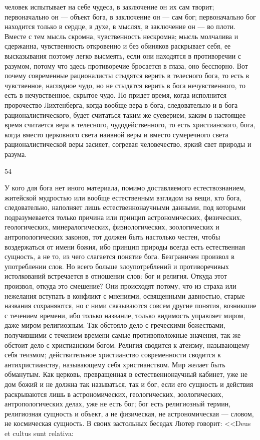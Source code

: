 \documentclass[12pt]{article}
\begin{document}
человек испытывает на себе чудеса, в заключение он их сам творит; первоначально он --- объект бога, в заключение он --- сам бог; первоначально бог находится только в сердце, в духе, в мыслях, в заключение он --- во плоти. Вместе с тем мысль скромна, чувственность нескромна; мысль молчалива и сдержанна, чувственность откровенно и без обиняков раскрывает себя, ее высказывания поэтому легко высмеять, если они находятся в противоречии с разумом, потому что здесь противоречие бросается в глаза, оно бесспорно. Вот почему современные рационалисты стыдятся верить в телесного бога, то есть в чувственное, наглядное чудо, но не стыдятся верить в бога нечувственного, то есть в нечувственное, скрытое чудо. Но придет время, когда исполнится пророчество Лихтенберга, когда вообще вера в бога, следовательно и в бога рационалистического, будет считаться таким же суеверием, каким в настоящее время считается вера в телесного, чудодейственного, то есть христианского, бога, когда вместо церковного света наивной веры и вместо сумеречного света рационалистической веры засияет, согревая человечество, яркий свет природы и разума.



54

У кого для бога нет иного материала, помимо доставляемого естествознанием, житейской мудростью или вообще естественным взглядом на вещи, кто бога, следовательно, наполняет лишь естественнонаучными данными, под которыми подразумевается только причина или принцип астрономических, физических, геологических, минералогических, физиологических, зоологических и антропологических законов, тот должен быть настолько честен, чтобы воздержаться от имени божия, ибо принцип природы всегда есть естественная сущность, а не то, из чего слагается понятие бога. Безграничен произвол в употреблении слов. Но всего больше злоупотреблений и противоречивых истолкований встречается в отношении слов: бог и религия. Откуда этот произвол, откуда это смешение? Они происходят потому, что из страха или нежелания вступать в конфликт с мнениями, освященными давностью, старые названия сохраняются, но с ними связываются совсем другие понятия, возникшие с течением времени, ибо только название, только видимость управляет миром, даже миром религиозным. Так обстояло дело с греческими божествами, получившими с течением времени самые противоположные значения, так же обстоит дело с христианским богом. Религия сводится к атеизму, называющему себя теизмом; действительное христианство современности сводится к антихристианству, называющему себя христианством. Мир желает быть обманутым. Как церковь, превращенная в естественнонаучный кабинет, уже не дом божий и не должна так называться, так и бог, если его сущность и действия раскрываются лишь в астрономических, геологических, зоологических, антропологических делах, уже не есть бог; бог есть религиозный термин, религиозная сущность и объект, а не физическая, не астрономическая --- словом, не космическая сущность. В своих застольных беседах Лютер говорит: <<Deus et cultus sunt relativa:
\end{document}
